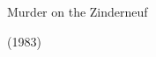\documentclass{beamer}
\begin{document}
\begin{frame}[plain]
\end{frame}

\begin{frame}[c]
	\centering
	\Huge
	Murder on the Zinderneuf
	
	(1983)
\end{frame}

\begin{frame}[plain]
\end{frame}
\end{document}
